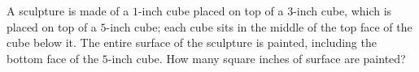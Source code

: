 A sculpture is made of a $1$-inch cube placed on top of a $3$-inch cube, which is placed on top of a $5$-inch cube; each cube sits in the middle of the top face of the cube below it. The entire surface of the sculpture is painted, including the bottom face of the $5$-inch cube. How many square inches of surface are painted?
